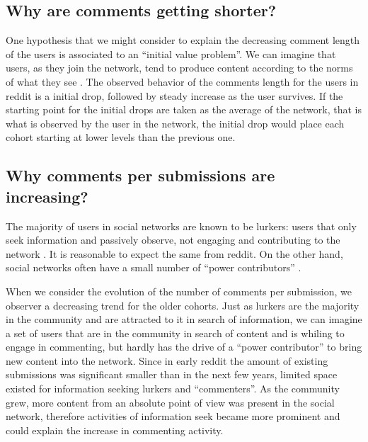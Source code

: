 \subsection{Why are comments getting shorter?}

One hypothesis that we might consider to explain the decreasing comment length of the users is associated to an ``initial value problem''. We can imagine that users, as they join the network, tend to produce content according to the norms of what they see \cite{Kooti2010, Danescu-niculescu-mizil2013}. The observed behavior of the comments length for the users in reddit is a initial drop, followed by steady increase as the user survives. If the starting point for the initial drops are taken as the average of the network, that is what is observed by the user in the network, the initial drop would place each cohort starting at lower levels than the previous one.

\subsection{Why comments per submissions are increasing?}

The majority of users in social networks are known to be lurkers: users that only seek information and passively observe, not engaging and contributing to the network \cite{Rafaeli2004, Nonnecke2000}. It is reasonable to expect the same from reddit. On the other hand, social networks often have a small number of ``power contributors'' \cite{Panciera2009, Kittur2007}.

When we consider the evolution of the number of comments per submission, we observer a decreasing trend for the older cohorts. Just as lurkers are the majority in the community and are attracted to it in search of information, we can imagine a set of users that are in the community in search of content and is whiling to engage in commenting, but hardly has the drive of a ``power contributor'' to bring new content into the network. Since in early reddit the amount of existing submissions was significant smaller than in the next few years, limited space existed for information seeking lurkers and ``commenters''. As the community grew, more content from an absolute point of view was present in the social network, therefore activities of information seek became more prominent and could explain the increase in commenting activity. 

